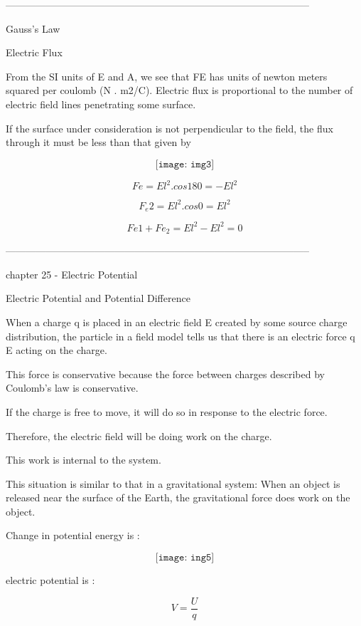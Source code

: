 \documentclass[11pt] {article}
\begin{document}
\vspace{10mm} %
--------------------------------------------------------------------------------------------

Gauss’s Law
\begin{center}
Electric Flux
\end{center}
From the SI units of E and A, we see that FE has units of newton meters squared per coulomb (N . m2/C). Electric flux is proportional to the number of electric field lines penetrating some surface.

If the surface under consideration is not perpendicular to the field, the flux through it must be less than that given by

$$\texttt{[image: img3]}$$

$$Fe = El^2 . cos180 = -El^2$$

$$F_e2 = El^2 . cos0 = El^2$$

$$Fe1 + Fe_2 = El^2 - El^2 = 0$$

\begin{center}
--------------------------------------------------------------------------------------------
\end{center}
chapter 25 - Electric Potential
\begin{center}
Electric Potential and Potential Difference
\end{center}

When a charge q is placed in an electric field E created by some source charge distribution, the particle in a field model tells us that there is an electric force q E acting on the charge. 

This force is conservative because the force between charges described by Coulomb’s law is conservative. 

If the charge is free to move, it will do so in response to the electric force. 

Therefore, the electric field will be doing work on the charge. 

This work is internal to the system. 

This situation is similar to that in a gravitational system: When an object is released near the surface of the Earth, the gravitational force does work on the object.

Change in potential energy is :  

$$\texttt{[image: ing5]}$$

electric potential is :

$$V =\frac{U} {q}$$
\end{document}
